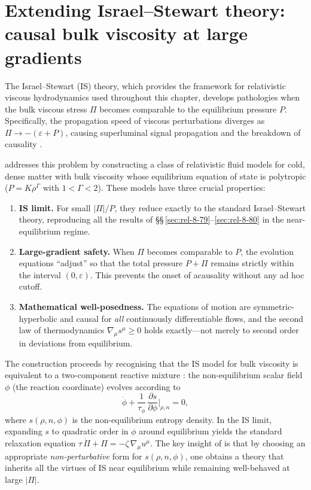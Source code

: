 \section{Extending Israel--Stewart theory: causal bulk viscosity
  at large gradients}\label{sec:rel-8-extending-IS}

The Israel--Stewart (IS) theory, which provides the framework for
relativistic viscous hydrodynamics used throughout this chapter, develops
pathologies when the bulk viscous stress $\Pi$ becomes comparable to the
equilibrium pressure $P$.  Specifically, the propagation speed of
viscous perturbations diverges as $\Pi \to -({\varepsilon + P})$,
causing superluminal signal propagation and the breakdown of causality
\citep{GavassinoBulkViscosity2020}.

\citet{GavassinoExtendingIS2025} addresses this problem by constructing
a class of relativistic fluid models for cold, dense matter with bulk
viscosity whose equilibrium equation of state is polytropic
($P = K\rho^{\Gamma}$ with $1 < \Gamma < 2$).  These models have three
crucial properties:
\begin{enumerate}
\item \textbf{IS limit.}  For small $|\Pi|/P$, they reduce exactly to
  the standard Israel--Stewart theory, reproducing all the results of
  \S\S\,\ref{sec:rel-8-79}--\ref{sec:rel-8-80} in the near-equilibrium
  regime.
\item \textbf{Large-gradient safety.}  When $\Pi$ becomes comparable to
  $P$, the evolution equations ``adjust'' so that the total pressure
  $P + \Pi$ remains strictly within the interval $(0, \varepsilon)$.
  This prevents the onset of acausality without any ad hoc cutoff.
\item \textbf{Mathematical well-posedness.}  The equations of motion are
  symmetric-hyperbolic and causal for \emph{all} continuously
  differentiable flows, and the second law of thermodynamics
  $\nabla_{\mu}s^{\mu}\geq 0$ holds exactly---not merely to second
  order in deviations from equilibrium.
\end{enumerate}

The construction proceeds by recognising that the IS model for bulk
viscosity is equivalent to a two-component reactive mixture
\citep{GavassinoBulkViscosity2020}: the non-equilibrium scalar field
$\phi$ (the reaction coordinate) evolves according to
\begin{equation}
\label{eq:rel-8-extended-IS}
\dot{\phi} + \frac{1}{\tau_{\phi}}\,
  \frac{\partial s}{\partial\phi}\bigg|_{\rho,n}
= 0,
\end{equation}
where $s(\rho, n, \phi)$ is the non-equilibrium entropy density.
In the IS limit, expanding $s$ to quadratic order in $\phi$ around
equilibrium yields the standard relaxation equation
$\tau\,\dot{\Pi}+\Pi = -\zeta\,\nabla_{\mu}u^{\mu}$.  The key insight
of \citet{GavassinoExtendingIS2025} is that by choosing an appropriate
\emph{non-perturbative} form for $s(\rho, n, \phi)$, one obtains a
theory that inherits all the virtues of IS near equilibrium while
remaining well-behaved at large $|\Pi|$.

